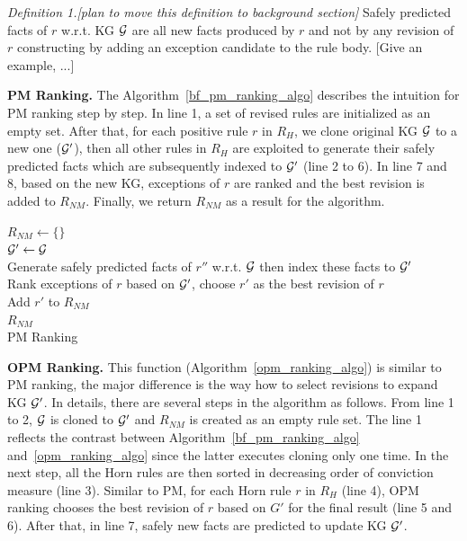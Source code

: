 \textit{Definition 1.[plan to move this definition to background section]} Safely predicted facts of $r$ w.r.t. KG $\mathcal{G}$ are all new facts produced by $r$ and not by any revision of $r$ constructing by adding an exception candidate to the rule body. [Give an example, ...]

\textbf{PM Ranking.} The Algorithm~\ref{bf_pm_ranking_algo} describes the intuition for PM ranking step by step. In line 1, a set of revised rules are initialized as an empty set. After that, for each positive rule $r$ in $R_H$, we clone original KG $\mathcal{G}$ to a new one ($\mathcal{G}'$), then all other rules in $R_H$ are exploited to generate their safely predicted facts which are subsequently indexed to $\mathcal{G}'$ (line 2 to 6). In line 7 and 8, based on the new KG, exceptions of $r$ are ranked and the best revision is added to $R_{NM}$. Finally, we return $R_{NM}$ as a result for the algorithm.

\IncMargin{1.5em}
\begin{algorithm}[H]
\DontPrintSemicolon
\SetAlgoLined
{}
\BlankLine
$R_{NM} \leftarrow \{\}$\\
\BlankLine
{} {
	$\mathcal{G}' \leftarrow \mathcal{G}$\\
	 {
		Generate safely predicted facts of $r''$ w.r.t. $\mathcal{G}$ then index these facts to $\mathcal{G}'$\\
	}
	Rank exceptions of $r$ based on $\mathcal{G}'$, choose $r'$ as the best revision of $r$\\
	Add $r'$ to $R_{NM}$\\
}
\Return $R_{NM}$\\
\caption{PM Ranking}
\label{bf_pm_ranking_algo}
\end{algorithm}
\DecMargin{1.5em}

\textbf{OPM Ranking.} This function (Algorithm~\ref{opm_ranking_algo}) is similar to PM ranking, the major difference is the way how to select revisions to expand KG $\mathcal{G}'$. In details, there are several steps in the algorithm as follows. From line 1 to 2, $\mathcal{G}$ is cloned to $\mathcal{G}'$ and $R_{NM}$ is created as an empty rule set. The line 1 reflects the contrast between Algorithm~\ref{bf_pm_ranking_algo} and~\ref{opm_ranking_algo} since the latter executes cloning only one time. In the next step, all the Horn rules are then sorted in decreasing order of conviction measure (line 3). Similar to PM, for each Horn rule $r$ in $R_H$ (line 4), OPM ranking chooses the best revision of $r$ based on $G'$ for the final result (line 5 and 6). After that, in line 7, safely new facts are predicted to update KG $\mathcal{G}'$.

